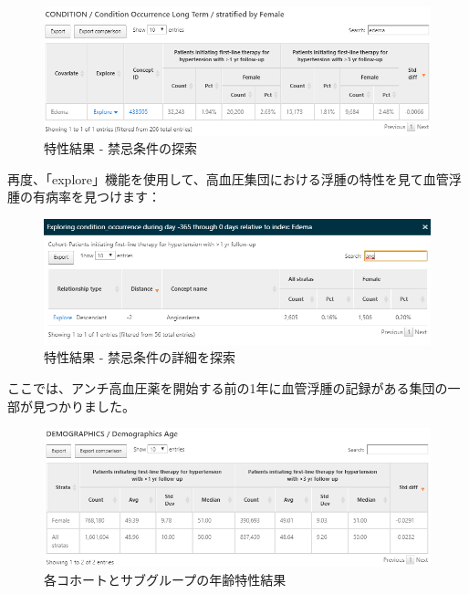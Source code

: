 \documentclass[
  11pt]{book}
\theoremstyle{definition}
\theoremstyle{definition}
\theoremstyle{definition}
\theoremstyle{definition}
\theoremstyle{remark}
\begin{document}
\begin{figure}

{\centering \includegraphics[width=1\linewidth]{images/Characterization/atlasCharacterizationResultsContra} 

}

\caption{特性結果 - 禁忌条件の探索}\label{fig:atlasCharacterizationResultsContra}
\end{figure}

再度、「explore」機能を使用して、高血圧集団における浮腫の特性を見て血管浮腫の有病率を見つけます：

\begin{figure}

{\centering \includegraphics[width=1\linewidth]{images/Characterization/atlasCharacterizationResultsContraExplore} 

}

\caption{特性結果 - 禁忌条件の詳細を探索}\label{fig:atlasCharacterizationResultsContraExplore}
\end{figure}

ここでは、アンチ高血圧薬を開始する前の1年に血管浮腫の記録がある集団の一部が見つかりました。

\begin{figure}

{\centering \includegraphics[width=1\linewidth]{images/Characterization/atlasCharacterizationResultsContinuous} 

}

\caption{各コホートとサブグループの年齢特性結果}\label{fig:atlasCharacterizationResultsContinuous}
\end{figure}
\end{document}
